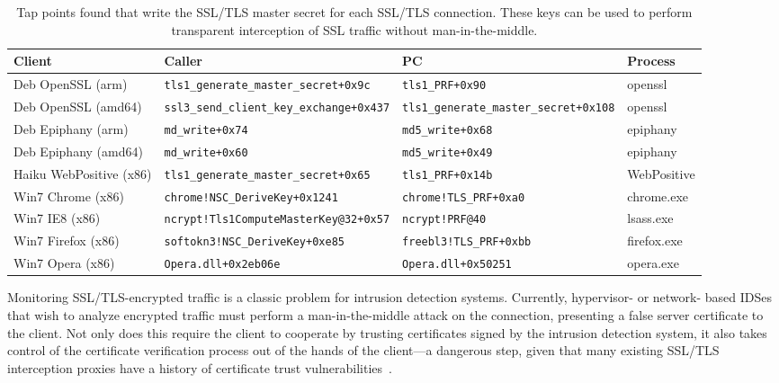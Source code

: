 \begin{table*}
    \centering
    \small
    \begin{tabular}{|l|l|l|l|}
        \hline
        Client & Caller & PC & Process \\
        \hline
        Deb OpenSSL (arm) & \texttt{tls1\_generate\_master\_secret+0x9c} & \texttt{tls1\_PRF+0x90} & openssl \\
        Deb OpenSSL (amd64) & \texttt{ssl3\_send\_client\_key\_exchange+0x437} & \texttt{tls1\_generate\_master\_secret+0x108} & openssl \\
        Deb Epiphany (arm) & \texttt{md\_write+0x74} & \texttt{md5\_write+0x68} & epiphany \\ 
        Deb Epiphany (amd64) & \texttt{md\_write+0x60} & \texttt{md5\_write+0x49} & epiphany \\ 
        Haiku WebPositive (x86) & \texttt{tls1\_generate\_master\_secret+0x65} & \texttt{tls1\_PRF+0x14b} & WebPositive \\
        Win7 Chrome (x86) & \texttt{chrome!NSC\_DeriveKey+0x1241} & \texttt{chrome!TLS\_PRF+0xa0} & chrome.exe \\
        Win7 IE8 (x86) & \texttt{ncrypt!Tls1ComputeMasterKey@32+0x57} & \texttt{ncrypt!PRF@40} & lsass.exe \\
        Win7 Firefox (x86) & \texttt{softokn3!NSC\_DeriveKey+0xe85} & \texttt{freebl3!TLS\_PRF+0xbb} & firefox.exe \\
        Win7 Opera (x86) & \texttt{Opera.dll+0x2eb06e} & \texttt{Opera.dll+0x50251} & opera.exe \\
        \hline
    \end{tabular}
\caption{Tap points found that write the SSL/TLS master secret for each
SSL/TLS connection. These keys can be used to perform transparent
interception of SSL traffic without man-in-the-middle.}
\label{tbl:ssl}
\end{table*}

Monitoring SSL/TLS-encrypted traffic is a classic problem for intrusion
detection systems. Currently, hypervisor- or network- based IDSes that
wish to analyze encrypted traffic must perform a man-in-the-middle
attack on the connection, presenting a false server certificate to the
client. Not only does this require the client to cooperate by trusting
certificates signed by the intrusion detection system, it also takes
control of the certificate verification process out of the hands of the
client---a dangerous step, given that many existing SSL/TLS interception
proxies have a history of certificate trust
vulnerabilities~\cite{JarmocBHEU2012}.

